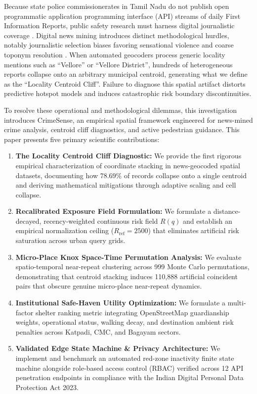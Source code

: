 \documentclass[conference]{IEEEtran}
\begin{document}
Because state police commissionerates in Tamil Nadu do not publish open programmatic application programming interface (API) streams of daily First Information Reports, public safety research must harness digital journalistic coverage \cite{gerber2014predicting, umair2020spatiotemporal}. Digital news mining introduces distinct methodological hurdles, notably journalistic selection biases favoring sensational violence \cite{earl2004use} and coarse toponym resolution \cite{gritta2020pragmatic, zandbergen2009geocoding}. When automated geocoders process generic locality mentions such as ``Vellore'' or ``Vellore District'', hundreds of heterogeneous reports collapse onto an arbitrary municipal centroid, generating what we define as the ``Locality Centroid Cliff''. Failure to diagnose this spatial artifact distorts predictive hotspot models and induces catastrophic risk boundary discontinuities.

To resolve these operational and methodological dilemmas, this investigation introduces CrimeSense, an empirical spatial framework engineered for news-mined crime analysis, centroid cliff diagnostics, and active pedestrian guidance. This paper presents five primary scientific contributions:
\begin{enumerate}
    \item \textbf{The Locality Centroid Cliff Diagnostic:} We provide the first rigorous empirical characterization of coordinate stacking in news-geocoded spatial datasets, documenting how 78.69\% of records collapse onto a single centroid and deriving mathematical mitigations through adaptive scaling and cell collapse.
    \item \textbf{Recalibrated Exposure Field Formulation:} We formulate a distance-decayed, recency-weighted continuous risk field $R(q)$ and establish an empirical normalization ceiling ($R_{\text{ref}} = 2500$) that eliminates artificial risk saturation across urban query grids.
    \item \textbf{Micro-Place Knox Space-Time Permutation Analysis:} We evaluate spatio-temporal near-repeat clustering across 999 Monte Carlo permutations, demonstrating that centroid stacking induces 110,888 artificial coincident pairs that obscure genuine micro-place near-repeat dynamics.
    \item \textbf{Institutional Safe-Haven Utility Optimization:} We formulate a multi-factor shelter ranking metric integrating OpenStreetMap guardianship weights, operational status, walking decay, and destination ambient risk penalties across Katpadi, CMC, and Bagayam sectors.
    \item \textbf{Validated Edge State Machine \& Privacy Architecture:} We implement and benchmark an automated red-zone inactivity finite state machine alongside role-based access control (RBAC) verified across 12 API penetration endpoints in compliance with the Indian Digital Personal Data Protection Act 2023.
\end{enumerate}
\end{document}
